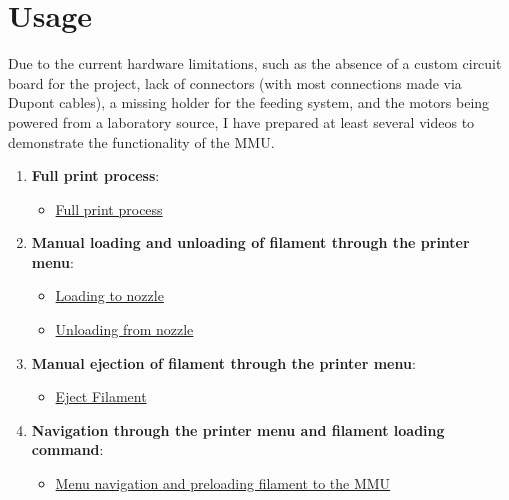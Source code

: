 \chapter{Usage}

Due to the current hardware limitations, such as the absence of a custom circuit board for the project, lack of connectors (with most connections made via Dupont cables), a missing holder for the feeding system, and the motors being powered from a laboratory source, I have prepared at least several videos to demonstrate the functionality of the MMU.

\begin{enumerate}
    \item \textbf{Full print process}:
    \begin{itemize}
        \item \href{https://photos.app.goo.gl/DKT1xrtT8koTUgd99}{Full print process}
    \end{itemize}

    \item \textbf{Manual loading and unloading of filament through the printer menu}:
    \begin{itemize}
        \item \href{https://photos.app.goo.gl/wqFypyLoTXfxn7oL6}{Loading to nozzle}
        \item \href{https://photos.app.goo.gl/Suu-VoyYZaYzWqgfW6}{Unloading from nozzle}
    \end{itemize}

    \item \textbf{Manual ejection of filament through the printer menu}:
    \begin{itemize}
        \item \href{https://photos.app.goo.gl/niqAs9w2io5AGW6d9}{Eject Filament}
    \end{itemize}

    \item \textbf{Navigation through the printer menu and filament loading command}:
    \begin{itemize}
        \item \href{https://photos.app.goo.gl/unaSUduo8NKmkBSx7}{Menu navigation and preloading filament to the MMU}
    \end{itemize}
\end{enumerate}



